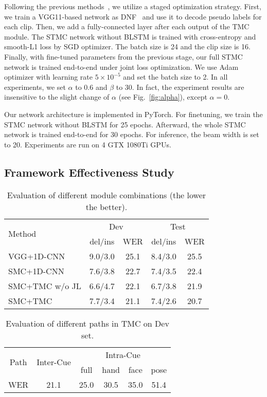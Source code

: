 \documentclass[letterpaper]{article} \usepackage{aaai20}  \usepackage{times}  \usepackage{helvet} \usepackage{courier}  \usepackage[hyphens]{url}  \usepackage{graphicx} \urlstyle{rm} \def\UrlFont{\rm}  \usepackage{graphicx}  \frenchspacing  \setlength{\pdfpagewidth}{8.5in}  \setlength{\pdfpageheight}{11in}
\begin{document}
Following the previous methods~\cite{resign,ian,cui-tmm19}, we utilize a staged optimization strategy. First, we train a VGG11-based network as DNF~\cite{cui-tmm19} and use it to decode pseudo labels for each clip. Then, we add a fully-connected layer after each output of the TMC module. The STMC network without BLSTM is trained with cross-entropy and smooth-L1 loss by SGD optimizer. The batch size is 24 and the clip size is 16. Finally, with fine-tuned parameters from the previous stage, our full STMC network is trained end-to-end under joint loss optimization. We use Adam optimizer with learning rate $5\times10^{-5}$ and set the batch size to 2. In all experiments, we set $\alpha$ to 0.6 and $\beta$ to 30. In fact, the experiment results are insensitive to the slight change of $\alpha$ (see Fig.~\ref{fig:alpha}), except $\alpha=0$.

Our network architecture is implemented in PyTorch. For finetuning, we train the STMC network without BLSTM for 25 epochs. Afterward, the whole STMC network is trained end-to-end for 30 epochs. For inference, the beam width is set to 20. Experiments are run on 4 GTX 1080Ti GPUs.


\subsection{Framework Effectiveness Study}
\begin{table}[tp]
    \centering
    \small
    \caption{Evaluation of different module combinations (the lower the better).} \label{tab:module}
    \begin{tabular}{l|cc|cc}
    \hline
    \multirow{2}{*}{Method} & \multicolumn{2}{c|}{Dev} & \multicolumn{2}{c}{Test} \\
                            & del/ins      & WER       & del/ins       & WER      \\ \hline
    VGG+1D-CNN              & 9.0/3.0      & 25.1      & 8.4/3.0       & 25.5     \\
    SMC+1D-CNN              & 7.6/3.8      & 22.7      & 7.4/3.5       & 22.4     \\
    SMC+TMC w/o JL          & 6.6/4.7      & 22.1      & 6.7/3.8       & 21.9     \\
    SMC+TMC                 & 7.7/3.4      & 21.1      & 7.4/2.6       & 20.7     \\ \hline
    \end{tabular}
\end{table}

\begin{table}[tp]
    \centering
    \small
    \caption{Evaluation of different paths in TMC on Dev set.} \label{tab:tmc}
    \begin{tabular*}{0.43\textwidth}{c|@{\extracolsep{\fill}}c|cccc}
    \hline
    \multirow{2}{*}{Path}&  \multirow{2}{*}{Inter-Cue} & \multicolumn{4}{c}{Intra-Cue}  \\ 
           &               & full     & hand   & face & pose \\ \hline
    WER &     21.1         & 25.0     & 30.5   & 35.0 & 51.4   \\ \hline
    \end{tabular*}
\end{table}
\end{document}
